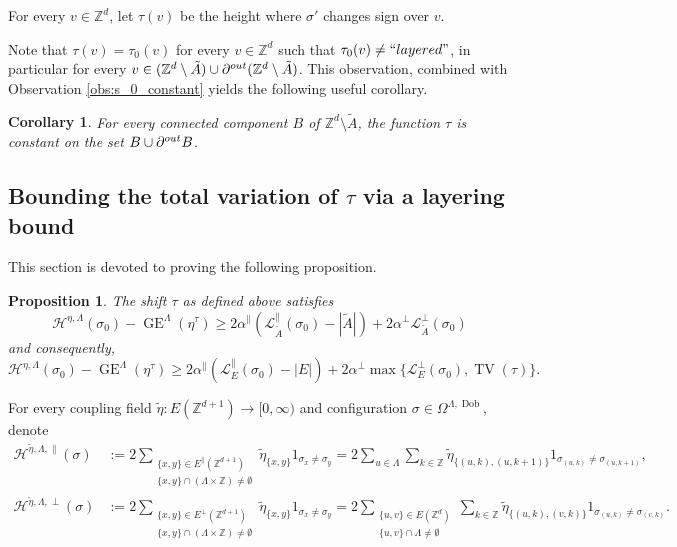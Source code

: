 \documentclass[11pt, reqno]{amsart}
\newtheorem{proposition}[theorem]{Proposition}
\newtheorem{corollary}[theorem]{Corollary}
\DeclareMathOperator{\Dob}{Dob}
\DeclareMathOperator{\GE}{GE}
\DeclareMathOperator{\TV}{TV}
\numberwithin{equation}{section}
\begin{document}
For every $v\in{\mathbb Z}^d$, let ${\tau}(v)$ be the height where $\sigma'$ changes sign over $v$.

Note that ${\tau}(v)={\tau}_0(v)$ for every $v\in{\mathbb Z}^d$ such that ${\tau}_0(v)\neq{\rm ``layered"}$, in particular for every $v\in({\mathbb Z}^d\setminus\tilde{A})\cup\partial^{\rm out}({\mathbb Z}^d\setminus\tilde{A})$.
This observation, combined with Observation \ref{obs:s_0_constant} yields the following useful corollary.

\begin{corollary}\label{cor:s_constant}
For every connected component $B$ of ${\mathbb Z}^d\setminus\tilde{A}$, the function ${\tau}$ is constant on the set $B\cup \partial^{\rm out}B$.
\end{corollary}

\subsection{Bounding the total variation of ${\tau}$ via a layering bound}

This section is devoted to proving the following proposition.

\begin{proposition}\label{prop:total_variation_bound_s}
The shift ${\tau}$ as defined above satisfies
\begin{equation}\label{eq:G_C}
\mathcal{H}^{\eta,\Lambda}(\sigma_0) -\GE^{\Lambda}(\eta^{{\tau}})\geq 2\alpha^{\parallel} \left( \mathcal{L}^{\parallel}_{\tilde{A}}(\sigma_0)-|\tilde{A}|\right)+2\alpha^{\perp}\mathcal{L}^{\perp}_{\tilde{A}}(\sigma_0)
\end{equation}
and consequently,
\begin{equation}\label{eq:G_E}
\mathcal{H}^{\eta,\Lambda}(\sigma_0) -\GE^{\Lambda}(\eta^{{\tau}})\geq 2\alpha^{\parallel} \left( \mathcal{L}^{\parallel}_E(\sigma_0)-|E|\right)+2\alpha^{\perp}\max\{\mathcal{L}^{\perp}_{E}(\sigma_0),\TV({\tau})\}.
\end{equation}
\end{proposition}

For every coupling field $\tilde{\eta}\colon E({\mathbb Z}^{d+1})\to[0,\infty)$ and configuration
$\sigma\in\Omega^{\Lambda,\Dob}$, denote
\begin{align*}
\mathcal{H}^{\tilde{\eta},\Lambda,\parallel}(\sigma)&:=2\sum_{\substack{\{x,y\}\in E^{\parallel}({\mathbb Z}^{d+1})\\\{x,y\}\cap(\Lambda\times{\mathbb Z})\neq\emptyset}} \tilde{\eta}_{\{x,y\}}
1_{\sigma_x\neq\sigma_y}=2\sum_{u\in\Lambda}\sum_{k\in{\mathbb Z}}\tilde{\eta}_{\{(u,k),(u,k+1)\}}1_{\sigma_{(u,k)}\neq\sigma_{(u,k+1)}},\\ \mathcal{H}^{\tilde{\eta},\Lambda,\perp}(\sigma)&:=2\sum_{\substack{\{x,y\}\in E^{\perp}({\mathbb Z}^{d+1})\\\{x,y\}\cap(\Lambda\times{\mathbb Z})\neq\emptyset}} \tilde{\eta}_{\{x,y\}}1_{\sigma_x\neq \sigma_y}=2\sum_{\substack{\{u,v\}\in E({\mathbb Z}^d)\\\{u,v\}\cap\Lambda\neq\emptyset}}\sum_{k\in{\mathbb Z}}\tilde{\eta}_{\{(u,k),(v,k)\}}1_{\sigma_{(u,k)}\neq\sigma_{(v,k)}}.
\end{align*}
\end{document}
